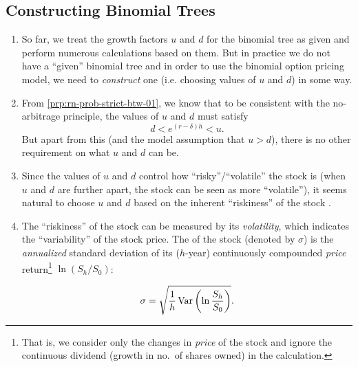\subsection{Constructing Binomial Trees}
\begin{enumerate}
\item So far, we treat the growth factors \(u\) and \(d\) for the binomial tree
as given and perform numerous calculations based on them. But in practice we do
not have a ``given'' binomial tree and in order to use the binomial option
pricing model, we need to \emph{construct} one (i.e. choosing values of \(u\)
and \(d\)) in some way.

\item \label{it:tree-ud-bounds}
From \cref{prp:rn-prob-strict-btw-01}, we know that to be consistent with
the no-arbitrage principle, the values of \(u\) and \(d\) must satisfy
\[
d<e^{(r-\delta)h}<u.
\]
But apart from this (and the model assumption that \(u>d\)), there is no other
requirement on what \(u\) and \(d\) can be.

\item Since the values of \(u\) and \(d\) control how ``risky''/``volatile'' the stock
 is (when \(u\) and \(d\) are further apart, the stock
 can be seen as more ``volatile''), it seems natural to
choose \(u\) and \(d\) based on the inherent ``riskiness'' of the stock
.

\item \label{it:volatility}
The ``riskiness'' of the stock  can be measured by its
\emph{volatility}, which indicates the ``variability'' of the stock price. The
 of the stock  (denoted by
\(\sigma\)) is the \emph{annualized} standard deviation of its
(\(h\)-year) continuously compounded \emph{price} return\footnote{That is, we
consider only the changes in \emph{price} of the stock and ignore the
continuous dividend (growth in no.\ of shares owned) in the calculation.} \(\ln
(S_h/S_0)\):

\[
\sigma=\sqrt{\frac{1}{h}\operatorname{Var}\qty(\ln\frac{S_h}{S_0})}.
\]


\end{enumerate}
